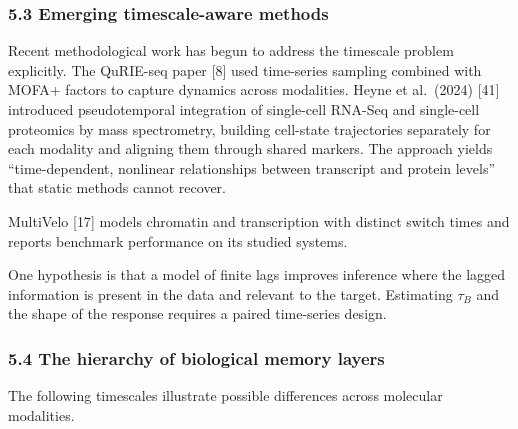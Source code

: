 \documentclass[
]{article}
\begin{document}
\hypertarget{emerging-timescale-aware-methods}{%
\subsubsection{5.3 Emerging timescale-aware
methods}\label{emerging-timescale-aware-methods}}

Recent methodological work has begun to address the timescale problem
explicitly. The QuRIE-seq paper {[}8{]} used time-series sampling
combined with MOFA+ factors to capture dynamics across modalities. Heyne
et al.~(2024) {[}41{]} introduced pseudotemporal integration of
single-cell RNA-Seq and single-cell proteomics by mass spectrometry,
building cell-state trajectories separately for each modality and
aligning them through shared markers. The approach yields
``time-dependent, nonlinear relationships between transcript and protein
levels'' that static methods cannot recover.

MultiVelo {[}17{]} models chromatin and transcription with distinct
switch times and reports benchmark performance on its studied systems.

One hypothesis is that a model of finite lags improves inference where
the lagged information is present in the data and relevant to the
target. Estimating \(\tau_B\) and the shape of the response requires a
paired time-series design.

\hypertarget{the-hierarchy-of-biological-memory-layers}{%
\subsubsection{5.4 The hierarchy of biological memory
layers}\label{the-hierarchy-of-biological-memory-layers}}

The following timescales illustrate possible differences across
molecular modalities.
\end{document}
